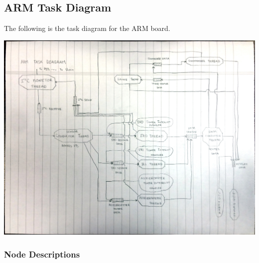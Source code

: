 








\subsection*{ARM Task Diagram}
The following is the task diagram for the ARM board.
\begin{center}
	\includegraphics[scale=0.6]{Images/ARMTaskDiagram}
\end{center}

\subsubsection*{Node Descriptions}

